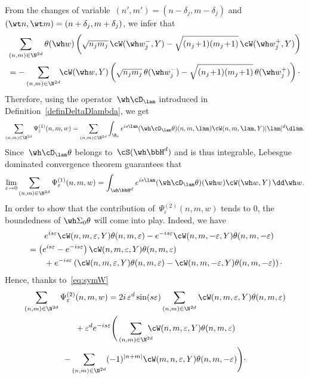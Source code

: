 {}From the changes of variable~$(n',m')=(n-\delta_j,m-\delta_j)$ and~$(\wt n,\wt m)=(n+\delta_j,m+\delta_j)$, we infer that
\begin{multline*}
\sum_{(n,m)\in \N^{2d}} \theta(\wh w) \left(\sqrt {n_jm_j} \,\cW(\wh w_j^-, Y) - \sqrt {(n_j\!+\!1)(m_j\!+\!1)}\, \cW (\wh w_j^+, Y)\right)\\
=-\sum_{(n,m)\in \N^{2d}} \!\! \cW(\wh w,Y) \left(\sqrt {n_jm_j} \,\theta (\wh w_j^-) - \sqrt {(n_j\!+\!1)(m_j\!+\!1)}\, \theta (\wh w_j^+)\right)\cdotp
\end{multline*}
Therefore, using the operator~$\wh\cD_\lam$ introduced in Definition~\ref{definDeltaDlambda}, we get
\[
\sum_{(n,m)\in\N^{2d} } \Psi^{(1)} _\varepsilon(n,m,w) = \sum_{(n,m)\in\N^{2d} } \int_{\R_\varepsilon} e^{is\lam} (\wh\cD_\lam\theta)(n,m,\lam)\cW (n,m,\lam, Y) |\lam|^d \dlam.
\]
Since~$\wh\cD_\lam \theta$ belongs to~$\cS(\wh \bbH^d)$ and is thus integrable, Lebesgue dominated convergence theorem guarantees that
\[
\lim_{\varepsilon\rightarrow 0} \sum_{(n,m)\in\N^{2d} } \Psi^{(1)} _\varepsilon(n,m,w) = \int_{\wh \bbH^d} e^{is\lam} (\wh\cD_\lam\theta)(\wh w)\cW (\wh w, Y)\, \dd\wh w.
\]
In order to show that the contribution of~$ \Psi^{(2)} _\varepsilon(n,m,w)$ tends to $0$, the boundedness of $\wh\Sigma_0\theta$ will come into play. Indeed, we have
\begin{multline*}
\quad e^{is\varepsilon} \cW (n,m, \varepsilon, Y)\theta (n,m, \varepsilon)- e^{-is\varepsilon} \cW (n,m,-\varepsilon, Y)\theta (n,m,-\varepsilon)\\
\begin{aligned}
&=\left(e^{is\varepsilon} - e^{-is\varepsilon}\right) \cW (n,m,\varepsilon, Y)\theta (n,m,\varepsilon)\\
&\qquad+e^{-is\varepsilon}\left(\cW(n,m,\varepsilon, Y)\theta (n,m,\varepsilon)- \cW (n,m,-\varepsilon,Y)\theta (n,m,-\varepsilon) \right)\cdotp
\end{aligned}
\end{multline*}
Hence, thanks to~\eqref{eq:symW}
\begin{multline*}
\sum_{(n,m)\in\N^{2d} } \Psi^{(2)} _\varepsilon(n,m,w) = 2i \, \varepsilon^d \sin (s \varepsilon) \sum_{(n,m)\in\N^{2d} } \cW (n,m,\varepsilon, Y)\theta (n,m,\varepsilon)\\
{}+ \varepsilon^d e^{-is\varepsilon} \Bigg(\sum_{(n,m)\in\N^{2d} }\!\!\!\!\! \cW (n,m,\varepsilon, Y)\theta(n,m, \varepsilon) \\
- \sum_{(n,m)\in\N^{2d} } (-1)^{|n+m|}\cW (m,n,\varepsilon, Y)\theta(n,m,-\varepsilon)\Bigg)\cdotp
\end{multline*}
